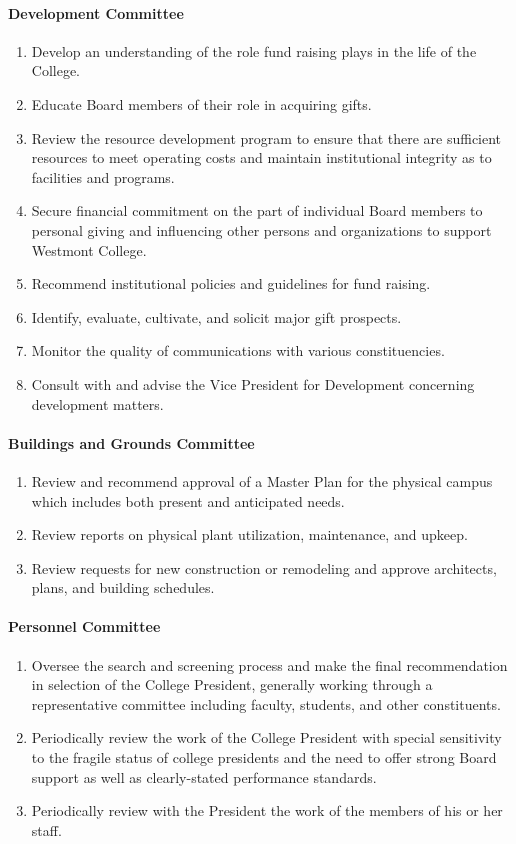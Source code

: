 \documentclass[letterpaper, 11pt]{article}
\begin{document}
			\paragraph{Development Committee}
				\begin{enumerate}
					\item{Develop an understanding of the role fund raising plays in the life of the College.}
					\item{Educate Board members of their role in acquiring gifts.}
					\item{Review the resource development program to ensure that there are sufficient resources to meet operating costs and maintain institutional integrity as to facilities and programs.}
					\item{Secure financial commitment on the part of individual Board members to personal giving and influencing other persons and organizations to support Westmont College.}
					\item{Recommend institutional policies and guidelines for fund raising.}
					\item{Identify, evaluate, cultivate, and solicit major gift prospects.}
					\item{Monitor the quality of communications with various constituencies.}
					\item{Consult with and advise the Vice President for Development concerning development matters.}
				\end{enumerate}
			\paragraph{Buildings and Grounds Committee}
				\begin{enumerate}
					\item{Review and recommend approval of a Master Plan for the physical campus which includes both present and anticipated needs.}
					\item{Review reports on physical plant utilization, maintenance, and upkeep.}
					\item{Review requests for new construction or remodeling and approve architects, plans, and building schedules.}
				\end{enumerate}
			\paragraph{Personnel Committee}
				\begin{enumerate}
					\item{Oversee the search and screening process and make the final recommendation in selection of the College President, generally working through a representative committee including faculty, students, and other constituents.}
					\item{Periodically review the work of the College President with special sensitivity to the fragile status of college presidents and the need to offer strong Board support as well as clearly-stated performance standards.}
					\item{Periodically review with the President the work of the members of his or her staff.}
				\end{enumerate}
\end{document}

